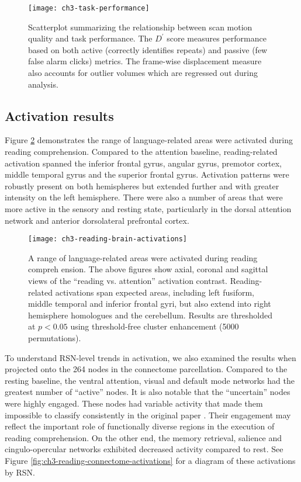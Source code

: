 \begin{figure}[t]
	\centering
	\texttt{[image: ch3-task-performance]}
    \caption[Description of scan motion quality and task performance.]{Scatterplot summarizing the relationship between scan motion quality and task performance. The $D^\prime$ score measures performance based on both active (correctly identifies repeats) and passive (few false alarm clicks) metrics. The frame-wise displacement measure also accounts for outlier volumes which are regressed out during analysis.}
	\label{fig:ch3-task-performance}
\end{figure}

\subsection{Activation results}

Figure \ref{fig:ch3-reading-brain-activations} demonstrates the range of language-related areas were activated during reading comprehension. Compared to the attention baseline, reading-related activation spanned the inferior frontal gyrus, angular gyrus, premotor cortex, middle temporal gyrus and the superior frontal gyrus. Activation patterns were robustly present on both hemispheres but extended further and with greater intensity on the left hemisphere. There were also a number of areas that were more active in the sensory and resting state, particularly in the dorsal attention network and anterior dorsolateral prefrontal cortex.

\begin{figure}[t]
	\centering
	\texttt{[image: ch3-reading-brain-activations]}
    \caption[A range of language-related areas were activated during reading comprehension.]{A range of language-related areas were activated during reading compreh ension. The above figures show axial, coronal and sagittal views of the ``reading vs. attention'' activation contrast. Reading-related activations span expected areas, including left fusiform, middle temporal and inferior frontal gyri, but also extend into right hemisphere homologues and the cerebellum. Results are thresholded at $p < 0.05$ using threshold-free cluster enhancement (5000 permutations).}
	\label{fig:ch3-reading-brain-activations}
\end{figure}

To understand RSN-level trends in activation, we also examined the results when projected onto the 264 nodes in the connectome parcellation. Compared to the resting baseline, the ventral attention, visual and default mode networks had the greatest number of ``active'' nodes. It is also notable that the ``uncertain'' nodes were highly engaged. These nodes had variable activity that made them impossible to classify consistently in the original paper \citep{Power2011}. Their engagement may reflect the important role of functionally diverse regions in the execution of reading comprehension. On the other end, the memory retrieval, salience and cingulo-opercular networks exhibited decreased activity compared to rest. See Figure \ref{fig:ch3-reading-connectome-activations} for a diagram of these activations by RSN. 

